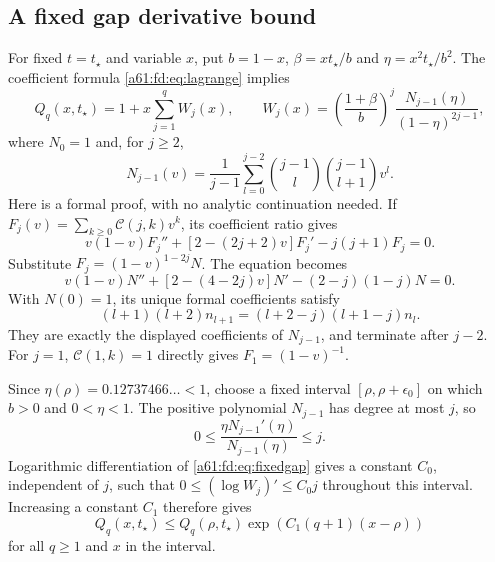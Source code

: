 \documentclass[11pt,letterpaper]{article}
\numberwithin{equation}{section}
\theoremstyle{remark}\newtheorem{remark}[theorem]{Remark}
\newcommand{\st}{\star}
\begin{document}
\subsection{A fixed gap derivative bound}
For fixed $t=t_\st$ and variable $x$, put $b=1-x$, $\beta=xt_\st/b$ and $\eta=x^2t_\st/b^2$. The coefficient formula \eqref{a61:fd:eq:lagrange} implies
\begin{equation}\label{a61:fd:eq:fixedgap}
 Q_q(x,t_\st)=1+x\sum_{j=1}^q W_j(x),\qquad
 W_j(x)=\left(\frac{1+\beta}{b}\right)^j
 \frac{N_{j-1}(\eta)}{(1-\eta)^{2j-1}},
\end{equation}
where $N_0=1$ and, for $j\ge2$,
\[
 N_{j-1}(v)=\frac1{j-1}\sum_{l=0}^{j-2}
 \binom{j-1}{l}\binom{j-1}{l+1}v^l.
\]
Here is a formal proof, with no analytic continuation needed. If $F_j(v)=\sum_{k\ge0}\mathcal C(j,k)v^k$, its coefficient ratio gives
\[
 v(1-v)F_j''+[2-(2j+2)v]F_j'-j(j+1)F_j=0.
\]
Substitute $F_j=(1-v)^{1-2j}N$. The equation becomes
\[
 v(1-v)N''+[2-(4-2j)v]N'-(2-j)(1-j)N=0.
\]
With $N(0)=1$, its unique formal coefficients satisfy
\[
 (l+1)(l+2)n_{l+1}=(l+2-j)(l+1-j)n_l.
\]
They are exactly the displayed coefficients of $N_{j-1}$, and terminate after $j-2$. For $j=1$, $\mathcal C(1,k)=1$ directly gives $F_1=(1-v)^{-1}$.

Since $\eta(\rho)=0.12737466\ldots<1$, choose a fixed interval $[\rho,\rho+\epsilon_0]$ on which $b>0$ and $0<\eta<1$. The positive polynomial $N_{j-1}$ has degree at most $j$, so
\[
 0\le\frac{\eta N_{j-1}'(\eta)}{N_{j-1}(\eta)}\le j.
\]
Logarithmic differentiation of \eqref{a61:fd:eq:fixedgap} gives a constant $C_0$, independent of $j$, such that $0\le(\log W_j)'\le C_0j$ throughout this interval. Increasing a constant $C_1$ therefore gives
\begin{equation}\label{a61:fd:eq:derivative}
 Q_q(x,t_\st)\le Q_q(\rho,t_\st)
       \exp(C_1(q+1)(x-\rho))
\end{equation}
for all $q\ge1$ and $x$ in the interval.
\end{document}
